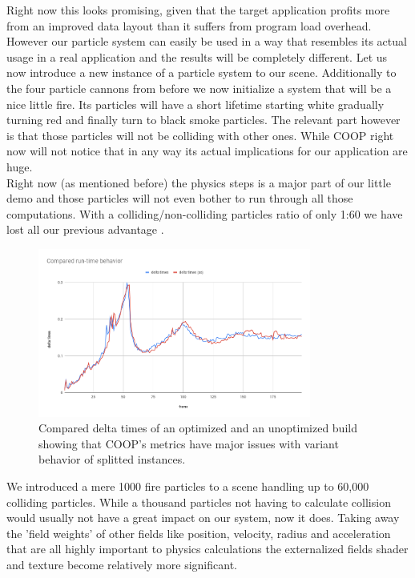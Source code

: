 Right now this looks promising, given that the target application profits more from an improved data layout than it suffers from program load overhead. However our particle system can easily be used in a way that resembles its actual usage in a real application and the results will be completely different. Let us now introduce a new instance of a particle system to our scene. Additionally to the four particle cannons from before we now initialize a system that will be a nice little fire. Its particles will have a short lifetime starting white gradually turning red and finally turn to black smoke particles. The relevant part however is that those particles will not be colliding with other ones. While COOP right now will not notice that in any way its actual implications for our application are huge.\\
Right now (as mentioned before) the physics steps is a major part of our little demo and those particles will not even bother to run through all those computations. With a colliding/non-colliding particles ratio of only 1:60 we have lost all our previous advantage .
\begin{figure}[!htbp]
	\centering
	\includegraphics[width=0.8\textwidth,height=0.6\textwidth]{PICs/delta_times_fire}
	\caption{Compared delta times of an optimized and an unoptimized build showing that COOP's metrics have major issues with variant behavior of splitted instances.}
	\label{delta_times_fire}
\end{figure}
We introduced a mere 1000 fire particles to a scene handling up to 60,000 colliding particles. While a thousand particles not having to calculate collision would usually not have a great impact on our system, now it does. Taking away the 'field weights' of other fields like position, velocity, radius and acceleration that are all highly important to physics calculations the externalized fields shader and texture become relatively more significant.\\
